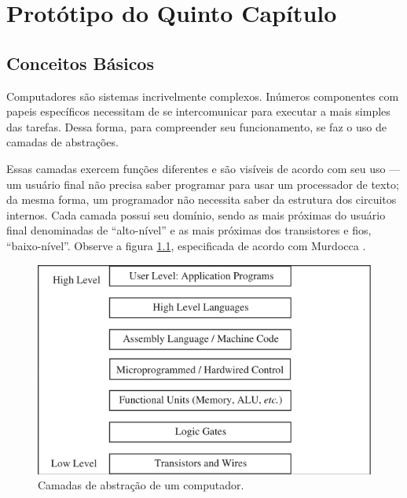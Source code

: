 \chapter{Protótipo do Quinto Capítulo}

\section{Conceitos Básicos}


Computadores são sistemas incrivelmente complexos. Inúmeros componentes com
papeis específicos necessitam de se intercomunicar para executar a mais simples das
tarefas. Dessa forma, para compreender seu funcionamento, se faz o uso de
camadas de abstrações.

Essas camadas exercem funções diferentes e são visíveis de acordo com seu uso
--- um usuário final não precisa saber programar para usar um processador de
texto; da mesma forma, um programador não necessita saber da estrutura dos
circuitos internos. Cada camada possui seu domínio, sendo as mais próximas do
usuário final denominadas de ``alto-nível'' e as mais próximas dos transistores
e fios, ``baixo-nível''. Observe a figura \ref{camadas}, especificada de acordo
com Murdocca \cite{principles}.

\begin{figure}[ptb]
  \begin{center}
    \includegraphics[scale=.6]{imagens/1_camadas}
  \end{center}
  \caption{Camadas de abstração de um computador.}
  \label{camadas}
\end{figure}

